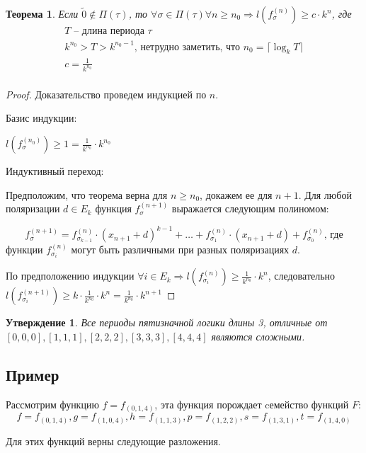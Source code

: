 \documentclass[bibliography=totoc, a4paper, 14pt]{extarticle}
\newtheorem{myth}{Теорема}
\newtheorem*{myst}{Утверждение}
\begin{document}
\begin{myth}
\label{th2}
Если $\tilde{0} \not\in \Pi(\tau)$, то $\forall \sigma \in \Pi(\tau) \forall n \geqslant n_0 \Rightarrow 
l(f_{\sigma}^{(n)}) \geqslant c \cdot k^n$, где
$$
\begin{array}{l}
T \text{ -- длина периода }\tau \\
k^{n_0} > T > k^{n_0 - 1} \text{, нетрудно заметить, что } n_0 = \lceil \log_kT \rceil \\
c = \frac{1}{k^{n_0}} \\
\end{array}
$$
\end{myth}
\begin{proof}
Доказательство проведем индукцией по $n$.

Базис индукции:

$l(f_{\sigma}^{(n_0)}) \geqslant 1 = \frac{1}{k^{n_0}} \cdot k^{n_0}$

Индуктивный переход:

Предположим, что теорема верна для $n \geqslant n_0$, докажем ее для $n+1$.
Для любой поляризации $d \in E_k$ функция $f_{\sigma}^{(n+1)}$ выражается следующим полиномом:

$$f_{\sigma}^{(n+1)} = f_{\sigma_{k-1}}^{(n)}\cdot(x_{n+1}+d)^{k-1} + \ldots +
f_{\sigma_1}^{(n)}\cdot(x_{n+1}+d) + f^{(n)}_{\sigma_0} \text{, где} $$
функции $f_{\sigma_i}^{(n)}$ могут быть различными при разных поляризациях $d$.


По предположению индукции $\forall i \in E_k \Rightarrow l(f_{\sigma_i}^{(n)}) \geqslant
\frac{1}{k^{n_0}} \cdot k^n$, следовательно $l(f_{\sigma_i}^{(n+1)}) \geqslant
k \cdot \frac{1}{k^{n_0}} \cdot k^n = \frac{1}{k^{n_0}} \cdot k^{n+1}$
\end{proof}

\begin{myst} Все периоды пятизначной логики длины 3, отличные от $[0,0,0], [1,1,1],
[2,2,2], [3,3,3], [4,4,4]$ являются сложными.
\end{myst}

\subsection{Пример}
Рассмотрим функцию $f=f_{(0,1,4)}$, эта функция порождает cемейство функций $F$:
$$
f=f_{(0,1,4)}, g=f_{(1,0,4)}, h=f_{(1,1,3)}, p=f_{(1,2,2)}, s=f_{(1,3,1)}, t=f_{(1,4,0)}
$$

Для этих функций верны следующие разложения.
\end{document}
